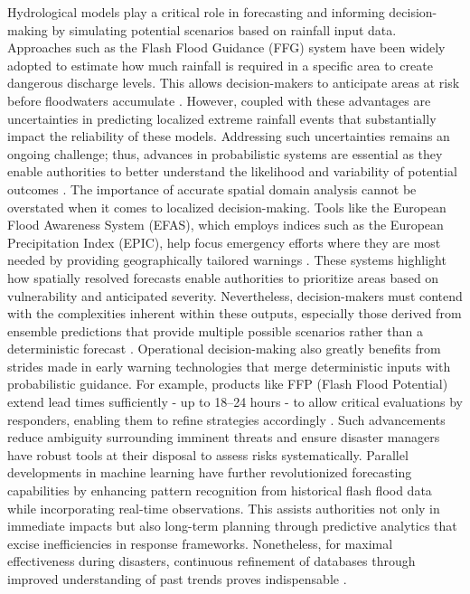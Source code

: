 Hydrological models play a critical role in forecasting and informing decision-making by simulating potential scenarios based on rainfall input data. Approaches such as the Flash Flood Guidance (FFG) system have been widely adopted to estimate how much rainfall is required in a specific area to create dangerous discharge levels. This allows decision-makers to anticipate areas at risk before floodwaters accumulate \citep{Javelle2016}. However, coupled with these advantages are uncertainties in predicting localized extreme rainfall events that substantially impact the reliability of these models. Addressing such uncertainties remains an ongoing challenge; thus, advances in probabilistic systems are essential as they enable authorities to better understand the likelihood and variability of potential outcomes \citep{Yussouf2020}.
The importance of accurate spatial domain analysis cannot be overstated when it comes to localized decision-making. Tools like the European Flood Awareness System (EFAS), which employs indices such as the European Precipitation Index (EPIC), help focus emergency efforts where they are most needed by providing geographically tailored warnings \citep{Javelle2016}\citep{Naulin2013}. These systems highlight how spatially resolved forecasts enable authorities to prioritize areas based on vulnerability and anticipated severity. Nevertheless, decision-makers must contend with the complexities inherent within these outputs, especially those derived from ensemble predictions that provide multiple possible scenarios rather than a deterministic forecast \citep{Silvestro2017}.
Operational decision-making also greatly benefits from strides made in early warning technologies that merge deterministic inputs with probabilistic guidance. For example, products like FFP (Flash Flood Potential) extend lead times sufficiently - up to 18–24 hours - to allow critical evaluations by responders, enabling them to refine strategies accordingly \citep{Poolman2014}. Such advancements reduce ambiguity surrounding imminent threats and ensure disaster managers have robust tools at their disposal to assess risks systematically.
Parallel developments in machine learning have further revolutionized forecasting capabilities by enhancing pattern recognition from historical flash flood data while incorporating real-time observations. This assists authorities not only in immediate impacts but also long-term planning through predictive analytics that excise inefficiencies in response frameworks. Nonetheless, for maximal effectiveness during disasters, continuous refinement of databases through improved understanding of past trends proves indispensable \citep{Yang2022}.
